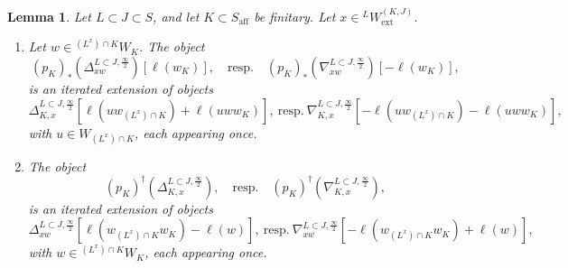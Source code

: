 \documentclass[11pt]{amsart}
\numberwithin{equation}{section}
\theoremstyle{plain}
\newtheorem{lem}[thm]{Lemma}
\theoremstyle{definition}
\newcommand{\semi}{{{\frac{\infty}{2}}}}
\newcommand{\ex}{\mathrm{ext}}
\newcommand{\af}{\mathrm{aff}}
\begin{document}
\begin{lem}
\label{lem:push-pull-pK-D-N-semi}
Let $L \subset J \subset S$, and let $K \subset S_\af$ be finitary.
Let $x\in {}^L W_\ex^{(K,J)}$. 
\begin{enumerate}
\item 
\label{it:push-pull-pK-D-N-semi-1}
Let $w\in {}^{(L^x)\cap K}W_K$. 
The object 
\[
(p_K)_*(\Delta^{L \subset J,\semi}_{xw})[\ell(w_K)], 
\quad \text{resp.}\quad 
(p_K)_*(\nabla^{L \subset J, \semi}_{xw})[-\ell(w_K)], 
\]
is an iterated extension of objects
\[
\Delta^{L \subset J,\semi}_{K,x}[\ell(uw_{(L^x)\cap K})+\ell(uww_K)], \
\text{resp.}\ \nabla^{L \subset J,\semi}_{K,x}[-\ell(uw_{(L^x)\cap K})-\ell(uww_K)],
\]
with $u\in W_{(L^x)\cap K}$, each appearing once. 
\item
\label{it:push-pull-pK-D-N-semi-2}
The object 
\[
(p_K)^\dag(\Delta^{L \subset J,\semi}_{K,x}), 
\quad \text{resp.}\quad 
(p_K)^\dag(\nabla^{L \subset J,\semi}_{K,x}), 
\]
is an iterated extension of objects
\[
\Delta^{L \subset J, \semi}_{xw}[\ell(w_{(L^x)\cap K}w_K)-\ell(w)], \
\text{resp.}\ \nabla^{L \subset J, \semi}_{xw}[-\ell(w_{(L^x)\cap K}w_K)+\ell(w)],
\]
with $w\in {}^{(L^x)\cap K}W_K$, each appearing once. 
\end{enumerate}
\end{lem}
\end{document}
